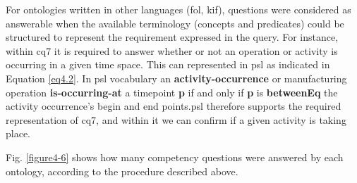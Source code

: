 For ontologies written in other languages (\gls{fol}, \gls{kif}), questions were considered as answerable when the available terminology (concepts and predicates) could be structured to represent the requirement expressed in the query. For instance,   within \gls{cq}7 it is required to answer whether or not an operation or activity is occurring in a given time space. This can represented in \gls{psl} as indicated in Equation \ref{eq4.2}. In \gls{psl} vocabulary an \textbf{activity-occurrence} or manufacturing operation \textbf{is-occurring-at} a timepoint \textbf{p} if and only if \textbf{p} is \textbf{betweenEq} the activity occurrence’s begin and end points.\gls{psl} therefore supports the required representation of \gls{cq}7, and within it we can confirm if a given activity is taking place.



Fig. \ref{figure4-6} shows how many competency   questions were answered by each ontology, according to the procedure described above. 



